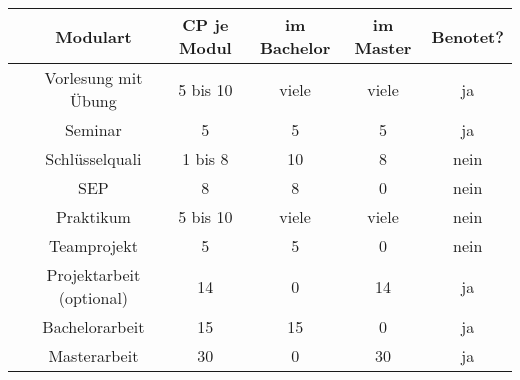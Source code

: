 \begin{tabular}{|p{3mm}|c|c|c|c|c|}
\hline & \textbf{Modulart}		& \textbf{CP je Modul} 	&\textbf{im Bachelor}	 	& \textbf{im Master}		& \textbf{Benotet?} \\ 
\hline & Vorlesung mit Übung	& 5 bis 10 				& viele						& viele						& ja \\ 
\hline & Seminar				& 5 	 				& 5 				& 5 						& ja \\ 
\hline & Schlüsselquali			& 1 bis 8 				& 10						& 8							& nein \\ 
\hline & SEP					& 8		 				& 8							& 0							& nein \\ 
\hline & Praktikum				& 5 bis 10 				& viele						& viele						& nein \\ 
\hline & Teamprojekt			& 5 				& 5						& 0							& nein \\ 
\hline & Projektarbeit	(optional)		& 14	 				& 0							& 14						& ja \\ 
\hline & Bachelorarbeit			& 15					& 15						& 0							& ja \\ 
\hline & Masterarbeit			& 30	 				& 0							& 30						& ja \\ 
\hline
\end{tabular} 
